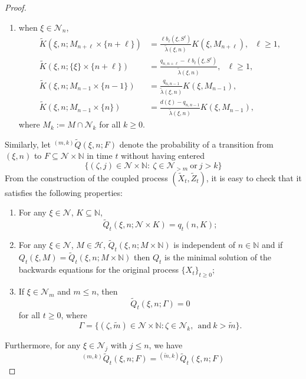 \documentclass[12pt]{article}
\newcommand{\leftsup}[2]{{}^{#1}\! #2}%
\newcommand{\N}{\mathbb{N}}
\newcounter{con}%
\numberwithin{equation}{section}
\begin{document}
\begin{proof}
\begin{enumerate}
\begin{align}
	\tilde{K}(\xi,n;\{\xi\}\times\{n-1\})&=\frac{q_{n,n-1}}{\tilde{\lambda}(\xi,n)};\nonumber
\end{align}
\item when $\xi\in\mathcal{N}_n$,
\begin{align}
	\tilde{K}(\xi,n;M_{n+\ell}\times\{n+\ell\})&=\frac{\ell b_{\ell}(\xi,S^{\ell})}{\tilde{\lambda}(\xi,n)}K(\xi,M_{n+\ell}),\ \ \ \ell\ge1,\nonumber\\
	\tilde{K}(\xi,n;\{\xi\}\times\{n+\ell\})&=\frac{q_{n,n+\ell}-\ell b_{\ell}(\xi,S^{\ell})}{\tilde{\lambda}(\xi,n)},\ \ \ \ell\ge1,\nonumber\\
	\tilde{K}(\xi,n;M_{n-1}\times\{n-1\})&=\frac{q_{n,n-1}}{\tilde{\lambda}(\xi,n)}K(\xi,M_{n-1}),\\
	\tilde{K}(\xi,n;M_{n-1}\times\{n\})&=\frac{d(\xi)-q_{n,n-1}}{\tilde{\lambda}(\xi,n)}K(\xi,M_{n-1}),\nonumber
\end{align}
where $M_k:=M\cap\mathcal{N}_k$ for all $k\ge0$.
\end{enumerate}
Similarly, let $\leftsup{(m,k)}{\tilde{Q}}(\xi,n;F)$ denote the probability of a transition from $(\xi,n)$ to $F\subseteq\mathcal{N}\times\N$ in time $t$ without having entered 
$$
\{(\zeta,j)\in\mathcal{N}\times\N:~\zeta\in\mathcal{N}_{>m} ~\mbox{or}~ j>k\}
$$
From the construction of the coupled process $(\tilde{X}_t,\tilde{Z}_t)$, it is easy to check that it satisfies the following properties:
\begin{enumerate}
	\item[i)] For any $\xi\in\mathcal{N}$, $K\subseteq \N$,
\begin{equation}
	\tilde{Q}_t(\xi,n;\mathcal{N}\times K)=q_t(n,K);
\end{equation}
\item[ii)] For any $\xi\in\mathcal{N}$, $M\in\mathscr{H}$,  $\tilde{Q}_t(\xi,n;M\times\N)$ is independent of $n\in\N$ and if $Q_t(\xi,M)=\tilde{Q}_t(\xi,n;M\times\N)$ then $Q_t$ is the minimal solution of the backwards equations for the original process $\{X_t\}_{t\ge0}$;
\item[iii)] If $\xi\in\mathcal{N}_m$ and $m\le n$, then 
	$$
	\tilde{Q}_t(\xi,n;\Gamma)=0
	$$
	for all $t\ge0$, where
	$$\Gamma=\{(\zeta,\tilde{m})\in\mathcal{N}\times \N:\zeta\in\mathcal{N}_k,~~\mbox{and}~ k>\tilde{m}\}.$$
\end{enumerate}
Furthermore, for any $\xi\in\mathcal{N}_j$ with $j\le n$, we have 
\begin{equation}
	\leftsup{(m,k)}{\tilde{Q}}_t(\xi,n;F)=\leftsup{(\tilde{m},k)}{\tilde{Q}}_t(\xi,n;F)

\end{equation}
\end{proof}
\end{document}
